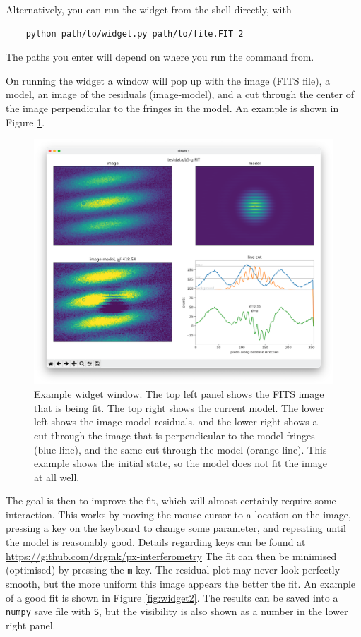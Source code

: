 \documentclass[11pt]{article}
\begin{document}
Alternatively, you can run the widget from the shell directly, with
\begin{verbatim}
    python path/to/widget.py path/to/file.FIT 2
\end{verbatim}
The paths you enter will depend on where you run the command from.

On running the widget a window will pop up with the image (FITS file), a model, an image of the residuals (image-model), and a cut through the center of the image perpendicular to the fringes in the model. An example is shown in Figure \ref{fig:widget}.

\begin{figure}[h!]
    \centering
    \includegraphics[width=1\textwidth]{widget.png}
    \caption{Example widget window. The top left panel shows the FITS image that is being fit. The top right shows the current model. The lower left shows the image-model residuals, and the lower right shows a cut through the image that is perpendicular to the model fringes (blue line), and the same cut through the model (orange line). This example shows the initial state, so the model does not fit the image at all well.}
    \label{fig:widget}
\end{figure}

The goal is then to improve the fit, which will almost certainly require some interaction. This works by moving the mouse cursor to a location on the image, pressing a key on the keyboard to change some parameter, and repeating until the model is reasonably good. Details regarding keys can be found at \href{https://github.com/drgmk/px-interferometry}{https://github.com/drgmk/px-interferometry} The fit can then be minimised (optimised) by pressing the \texttt{m} key. The residual plot may never look perfectly smooth, but the more uniform this image appears the better the fit. An example of a good fit is shown in Figure \ref{fig:widget2}. The results can be saved into a \texttt{numpy} save file with \texttt{S}, but the visibility is also shown as a number in the lower right panel.
\end{document}
